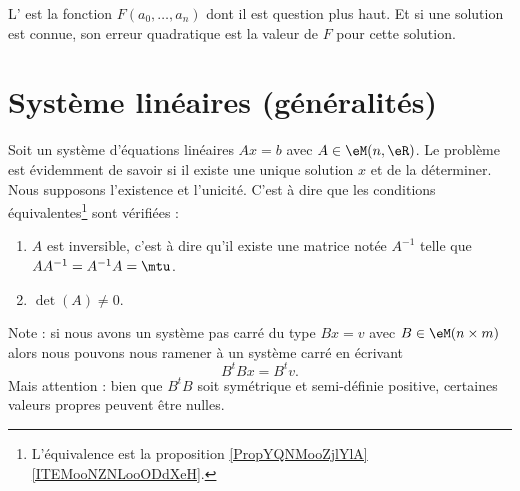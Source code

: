 \begin{definition}
    L' est la fonction \( F(a_0,\ldots, a_n)\) dont il est question plus haut. Et si une solution est connue, son erreur quadratique est la valeur de $F$ pour cette solution.
\end{definition}

\section{Système linéaires (généralités)}

Soit un système d'équations linéaires \( Ax=b\) avec \( A\in \eM(n,\eR)\). Le problème est évidemment de savoir si il existe une unique solution \( x\) et de la déterminer. Nous supposons l'existence et l'unicité. C'est à dire que les conditions équivalentes\footnote{L'équivalence est la proposition \ref{PropYQNMooZjlYlA}\ref{ITEMooNZNLooODdXeH}.} sont vérifiées :
\begin{enumerate}
    \item
        \( A\) est inversible, c'est à dire qu'il existe une matrice notée \( A^{-1}\) telle que \( AA^{-1}=A^{-1}A=\mtu\).
    \item
        \( \det(A)\neq 0\).
\end{enumerate}
Note : si  nous avons un système pas carré du type \( Bx=v\) avec \( B\in \eM(n\times m)\) alors nous pouvons nous ramener à un système carré en écrivant
\begin{equation}
    B^tBx=B^tv.
\end{equation}
Mais attention : bien que \( B^tB\) soit symétrique et semi-définie positive, certaines valeurs propres peuvent être nulles.

